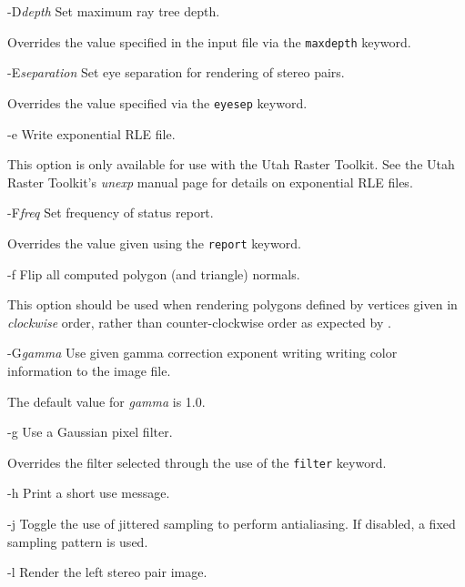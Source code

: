 \begin{defkey}{-D}{{\em depth}}
	Set maximum ray tree depth.
\end{defkey}
Overrides the value specified in the input file via the {\tt maxdepth}
keyword.

\begin{defkey}{-E}{{\em separation}}
	Set eye separation for rendering of stereo pairs.
\end{defkey}
Overrides the value specified via the {\tt eyesep} keyword.

\begin{defkey}{-e}{}
	Write exponential RLE file.
\end{defkey}
This option is only available for use with the Utah Raster Toolkit.
See the Utah Raster Toolkit's {\em unexp} manual page for details on
exponential RLE files.

\begin{defkey}{-F}{{\em freq}}
	Set frequency of status report.
\end{defkey}
Overrides the value given using the {\tt report} keyword.

\begin{defkey}{-f}{}
	Flip all computed polygon (and triangle) normals.
\end{defkey}
This option should be used when rendering polygons defined
by vertices given in {\em clockwise}
order, rather than counter-clockwise order as
expected by {\rayshade}.

\begin{defkey}{-G}{{\em gamma}}
	Use given gamma correction exponent writing writing
	color information to the image file.
\end{defkey}
The default value for {\em gamma} is 1.0.

\begin{defkey}{-g}{}
	Use a Gaussian pixel filter.
\end{defkey}
Overrides the filter selected through the use of the {\tt filter}
keyword.

\begin{defkey}{-h}{}
	Print a short use message.
\end{defkey}

\begin{defkey}{-j}{}
	Toggle the use of jittered sampling to perform antialiasing.
	If disabled, a fixed sampling pattern is used.
\end{defkey}

\begin{defkey}{-l}{}
	Render the left stereo pair image.
\end{defkey}

